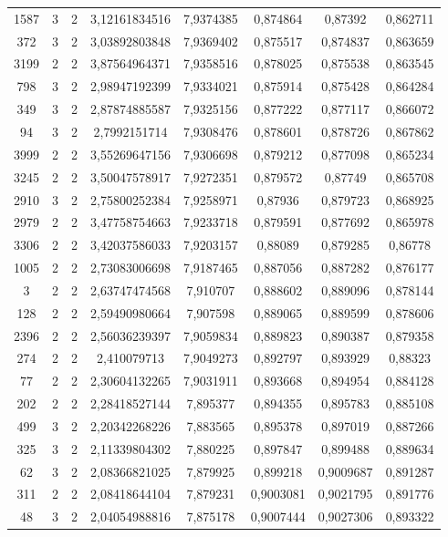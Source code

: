 \begin{longtable}{|c|c|c|c|c|c|c|c|}
1587 & 3 & 2 & 3,12161834516 & 7,9374385 & 0,874864 & 0,87392 & 0,862711 \\
372 & 3 & 2 & 3,03892803848 & 7,9369402 & 0,875517 & 0,874837 & 0,863659 \\
3199 & 2 & 2 & 3,87564964371 & 7,9358516 & 0,878025 & 0,875538 & 0,863545 \\
798 & 3 & 2 & 2,98947192399 & 7,9334021 & 0,875914 & 0,875428 & 0,864284 \\
349 & 3 & 2 & 2,87874885587 & 7,9325156 & 0,877222 & 0,877117 & 0,866072 \\
94 & 3 & 2 & 2,7992151714 & 7,9308476 & 0,878601 & 0,878726 & 0,867862 \\
3999 & 2 & 2 & 3,55269647156 & 7,9306698 & 0,879212 & 0,877098 & 0,865234 \\
3245 & 2 & 2 & 3,50047578917 & 7,9272351 & 0,879572 & 0,87749 & 0,865708 \\
2910 & 3 & 2 & 2,75800252384 & 7,9258971 & 0,87936 & 0,879723 & 0,868925 \\
2979 & 2 & 2 & 3,47758754663 & 7,9233718 & 0,879591 & 0,877692 & 0,865978 \\
3306 & 2 & 2 & 3,42037586033 & 7,9203157 & 0,88089 & 0,879285 & 0,86778 \\
1005 & 2 & 2 & 2,73083006698 & 7,9187465 & 0,887056 & 0,887282 & 0,876177 \\
3 & 2 & 2 & 2,63747474568 & 7,910707 & 0,888602 & 0,889096 & 0,878144 \\
128 & 2 & 2 & 2,59490980664 & 7,907598 & 0,889065 & 0,889599 & 0,878606 \\
2396 & 2 & 2 & 2,56036239397 & 7,9059834 & 0,889823 & 0,890387 & 0,879358 \\
274 & 2 & 2 & 2,410079713 & 7,9049273 & 0,892797 & 0,893929 & 0,88323 \\
77 & 2 & 2 & 2,30604132265 & 7,9031911 & 0,893668 & 0,894954 & 0,884128 \\
202 & 2 & 2 & 2,28418527144 & 7,895377 & 0,894355 & 0,895783 & 0,885108 \\
499 & 3 & 2 & 2,20342268226 & 7,883565 & 0,895378 & 0,897019 & 0,887266 \\
325 & 3 & 2 & 2,11339804302 & 7,880225 & 0,897847 & 0,899488 & 0,889634 \\
62 & 3 & 2 & 2,08366821025 & 7,879925 & 0,899218 & 0,9009687 & 0,891287 \\
311 & 2 & 2 & 2,08418644104 & 7,879231 & 0,9003081 & 0,9021795 & 0,891776 \\
48 & 3 & 2 & 2,04054988816 & 7,875178 & 0,9007444 & 0,9027306 & 0,893322 \\

\end{longtable}
